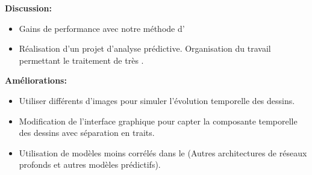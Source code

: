 \textbf{Discussion:}
\begin{itemize}
    \item Gains de performance avec notre méthode d'
    \item Réalisation  d'un projet d'analyse prédictive.
    Organisation du travail permettant le traitement de très .
\end{itemize}

\textbf{Améliorations:}
\begin{itemize}
    \item  Utiliser différents  d'images pour simuler l'évolution temporelle des dessins.
    \item Modification de l'interface graphique pour capter la composante temporelle des dessins avec séparation en traits.
    \item Utilisation de modèles moins corrélés dans le  (Autres architectures de réseaux profonds et autres modèles prédictifs).
\end{itemize}
\vspace{-3.5mm}